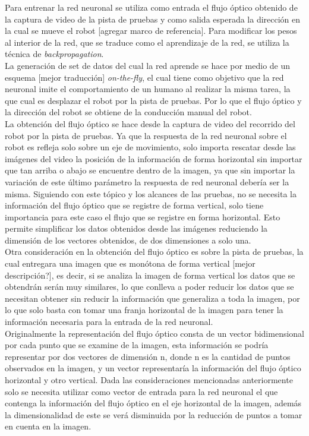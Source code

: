 \documentclass{iccmemoria}
\begin{document}
Para entrenar la red neuronal se utiliza como entrada el flujo óptico obtenido de la captura de video de la pista de pruebas y como salida esperada la dirección en la cual se mueve el robot [agregar marco de referencia]. Para modificar los pesos al interior de la red, que se traduce como el aprendizaje de la red, se utiliza la técnica de \emph{backpropagation}.\\

La generación de set de datos del cual la red aprende se hace por medio de un esquema [mejor traducción] \emph{on-the-fly}, el cual tiene como objetivo que la red neuronal imite el comportamiento de un humano al realizar la misma tarea, la que cual es desplazar el robot por la pista de pruebas. Por lo que el flujo óptico y la dirección del robot se obtiene de la conducción manual del robot.\\

La obtención del flujo óptico se hace desde la captura de video del recorrido del robot por la pista de pruebas. Ya que la respuesta de la red neuronal sobre el robot es refleja solo sobre un eje de movimiento, solo importa rescatar desde las imágenes del video la posición de la información de forma horizontal sin importar que tan arriba o abajo se encuentre dentro de la imagen, ya que sin importar la variación de este último parámetro la respuesta de red neuronal debería ser la misma.
Siguiendo con este tópico y los alcances de las pruebas, no se necesita la información del flujo óptico que se registre de forma vertical, solo tiene importancia para este caso el flujo que se registre en forma horizontal. Esto permite simplificar los datos obtenidos desde las imágenes reduciendo la dimensión de los vectores obtenidos, de dos dimensiones a solo una.\\

Otra consideración en la obtención del flujo óptico es sobre la pista de pruebas, la cual entregara una imagen que es monótona de forma vertical [mejor descripción?], es decir, si se analiza la imagen de forma vertical los datos que se obtendrán serán muy similares, lo que conlleva a poder reducir los datos que se necesitan obtener sin reducir la información que generaliza a toda la imagen, por lo que solo basta con tomar una franja horizontal de la imagen para tener la información necesaria para la entrada de la red neuronal.\\

Originalmente la representación del flujo óptico consta de un vector bidimensional por cada punto que se examine de la imagen, esta información se podría representar por dos vectores de dimensión n, donde n es la cantidad de puntos observados en la imagen, y un vector representaría la información del flujo óptico horizontal y otro vertical. Dada las consideraciones mencionadas anteriormente solo se necesita utilizar como vector de entrada para la red neuronal el que contenga la información del flujo óptico en el eje horizontal de la imagen, además la dimensionalidad de este se verá disminuida por la reducción de puntos a tomar en cuenta en la imagen.\\
\end{document}
